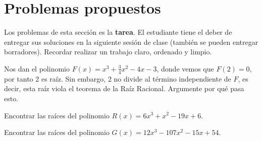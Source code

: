 \section{Problemas propuestos}

Los problemas de esta sección es la \textbf{tarea}.
El estudiante tiene el deber de entregar sus soluciones en la siguiente sesión de clase (también se pueden entregar borradores).
Recordar realizar un trabajo claro, ordenado y limpio.

    \begin{exercise}
        Nos dan el polinomio $F(x) = x^3 + \frac{3}{4}x^2 - 4x - 3$, donde vemos que $F(2) = 0$, por tanto 2 es raíz.
        Sin embargo, 2 no divide al término independiente de $F$, es decir, esta raíz viola el teorema de la Raíz Racional.
        Argumente por qué pasa esto.
    \end{exercise}

    \begin{exercise}
        Encontrar las raíces del polinomio $R(x) = 6x^3 + x^2 - 19x + 6$.
    \end{exercise}

    \begin{exercise}
        Encontrar las raíces del polinomio $G(x) = 12x^3 - 107x^2 - 15x + 54$.
    \end{exercise}